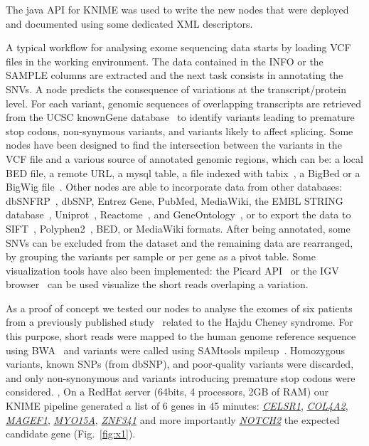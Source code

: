 \documentclass{bioinfo}
\begin{document}
The java API for KNIME was used to write the new nodes that were deployed and documented using some dedicated XML descriptors.

A typical workflow for analysing exome sequencing data starts by loading VCF files in the working environment. The data contained in the INFO or the SAMPLE columns are extracted and the next task consists in annotating the SNVs. A node predicts the consequence of variations at the transcript/protein level. For each variant, genomic sequences of overlapping transcripts are retrieved from the UCSC knownGene database~\citep{pmid16500937} to identify variants leading to premature stop codons, non-synymous variants, and variants likely to affect splicing.  Some nodes have been designed to find the intersection between the variants in the VCF file and a various source of annotated genomic regions, which can be: a local BED file, a remote URL, a mysql table, a file indexed with tabix~\citep{pmid21208982}, a BigBed or a BigWig file~\citep{pmid20639541}. Other nodes are able to incorporate data from other databases: dbSNFRP~\citep{pmid21520341}, dbSNP, Entrez Gene, PubMed, MediaWiki, the EMBL STRING database~\citep{pmid17098935}, Uniprot~\citep{pmid21447597}, Reactome~\citep{pmid21067998}, and GeneOntology~\citep{pmid18957448}, or to export the data to SIFT~\citep{pmid11337480}, Polyphen2~\citep{pmid20354512}, BED, or MediaWiki formats. After being annotated, some SNVs can be excluded from the dataset and the remaining data are rearranged, by grouping the variants per sample or per gene as a pivot table. Some visualization tools have also been implemented: the Picard API~\citep{pmid19505943} or the IGV browser~\citep{pmid21221095} can be used visualize the short reads overlaping a variation.

As a proof of concept we tested our nodes to analyse the exomes of six patients from a previously published study~\citep{pmid21378989} related to the Hajdu Cheney syndrome. For this purpose, short reads were mapped to the human genome reference sequence using BWA~\citep{pmid20080505} and variants were called using SAMtools mpileup~\citep{pmid19505943}. Homozygous variants, known SNPs (from dbSNP), and poor-quality variants were discarded, and only non-synonymous and variants introducing premature stop codons were considered. , On a RedHat server (64bits, 4 processors, 2GB of RAM) our KNIME pipeline generated a list of 6 genes in 45 minutes: \href{http://www.ncbi.nlm.nih.gov/gene/9620}{\textit{CELSR1}},  \href{http://www.ncbi.nlm.nih.gov/gene/1284}{\textit{COL4A2}}, \href{http://www.ncbi.nlm.nih.gov/gene/64110}{\textit{MAGEF1}}, \href{http://www.ncbi.nlm.nih.gov/gene/51168}{\textit{MYO15A}}, \href{http://www.ncbi.nlm.nih.gov/gene/84905}{\textit{ZNF341}} and more importantly \href{http://www.ncbi.nlm.nih.gov/gene/4853}{\textit{NOTCH2}} the expected candidate gene (Fig.~\ref{fig:x1}).
\end{document}

